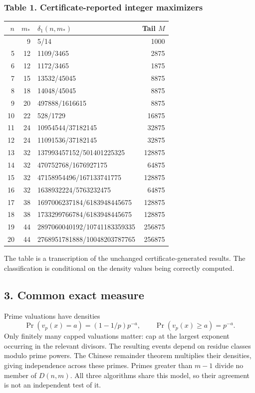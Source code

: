 \documentclass[
  11pt,
]{article}
\begin{document}
\newpage

\subsubsection{Table 1. Certificate-reported integer
maximizers}\label{table-1.-certificate-reported-integer-maximizers}

\begin{longtable}[]{@{}rrlr@{}}
\toprule\noalign{}
\(n\) & \(m_*\) & \(\delta_1(n,m_*)\) & Tail \(M\) \\
\midrule\noalign{}
\endhead
\bottomrule\noalign{}
\endlastfoot
4 & 9 & 5/14 & 1000 \\
5 & 12 & 1109/3465 & 2875 \\
6 & 12 & 1172/3465 & 1875 \\
7 & 15 & 13532/45045 & 8875 \\
8 & 18 & 14048/45045 & 8875 \\
9 & 20 & 497888/1616615 & 8875 \\
10 & 22 & 528/1729 & 16875 \\
11 & 24 & 10954544/37182145 & 32875 \\
12 & 24 & 11091536/37182145 & 32875 \\
13 & 32 & 137993457152/501401225325 & 128875 \\
14 & 32 & 470752768/1676927175 & 64875 \\
15 & 32 & 47158954496/167133741775 & 128875 \\
16 & 32 & 1638932224/5763232475 & 64875 \\
17 & 38 & 1697006237184/6183948445675 & 128875 \\
18 & 38 & 1733299766784/6183948445675 & 128875 \\
19 & 44 & 2897060040192/10741183359335 & 256875 \\
20 & 44 & 2768951781888/10048203787765 & 256875 \\
\end{longtable}

The table is a transcription of the unchanged certificate-generated
results. The classification is conditional on the density values being
correctly computed.

\subsection{3. Common exact measure}\label{common-exact-measure}

Prime valuations have densities
\[\Pr(v_p(x)=a)=(1-1/p)p^{-a},\qquad\Pr(v_p(x)\ge a)=p^{-a}.\] Only
finitely many capped valuations matter: cap at the largest exponent
occurring in the relevant divisors. The resulting events depend on
residue classes modulo prime powers. The Chinese remainder theorem
multiplies their densities, giving independence across these primes.
Primes greater than \(m-1\) divide no member of \(D(n,m)\). All three
algorithms share this model, so their agreement is not an independent
test of it.
\end{document}
